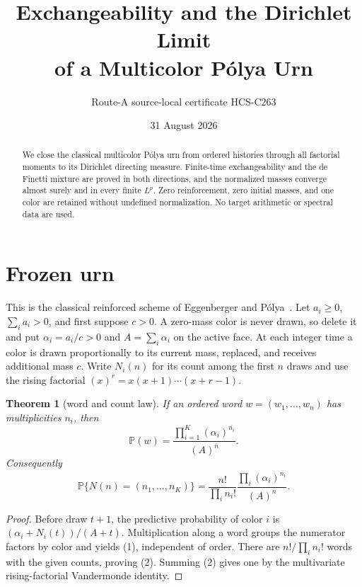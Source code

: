 \documentclass[10pt]{article}
\title{Exchangeability and the Dirichlet Limit\\of a Multicolor P\'olya Urn}
\author{Route-A source-local certificate HCS-C263}
\date{31 August 2026}
\newtheorem{theorem}{Theorem}
\newcommand{\Prb}{\mathbb P}
\begin{document}
\maketitle
\begin{abstract}
We close the classical multicolor P\'olya urn from ordered histories through
all factorial moments to its Dirichlet directing measure.  Finite-time
exchangeability and the de Finetti mixture are proved in both directions, and
the normalized masses converge almost surely and in every finite $L^p$.
Zero reinforcement, zero initial masses, and one color are retained without
undefined normalization.  No target arithmetic or spectral data are used.
\end{abstract}

\section{Frozen urn}
This is the classical reinforced scheme of Eggenberger and
P\'olya~\cite{EP}.
Let $a_i\ge0$, $\sum_i a_i>0$, and first suppose $c>0$.  A zero-mass color is
never drawn, so delete it and put $\alpha_i=a_i/c>0$ and
$A=\sum_i\alpha_i$ on the active face.  At each integer time a color is
drawn proportionally to its current mass, replaced, and receives additional
mass $c$.  Write $N_i(n)$ for its count among the first $n$ draws and use the
rising factorial $(x)^{\overline r}=x(x+1)\cdots(x+r-1)$.

\begin{theorem}[word and count law]
If an ordered word $w=(w_1,\ldots,w_n)$ has multiplicities $n_i$, then
\begin{equation}
 \Prb(w)=\frac{\prod_{i=1}^K(\alpha_i)^{\overline{n_i}}}
 {(A)^{\overline n}}.
\end{equation}
Consequently
\begin{equation}
 \Prb\{N(n)=(n_1,\ldots,n_K)\}
 =\frac{n!}{\prod_i n_i!}
 \frac{\prod_i(\alpha_i)^{\overline{n_i}}}{(A)^{\overline n}}.
\end{equation}
\end{theorem}
\begin{proof}
Before draw $t+1$, the predictive probability of color $i$ is
$(\alpha_i+N_i(t))/(A+t)$.  Multiplication along a word groups the numerator
factors by color and yields (1), independent of order.  There are
$n!/\prod_i n_i!$ words with the given counts, proving (2).  Summing (2)
gives one by the multivariate rising-factorial Vandermonde identity.
\end{proof}
\end{document}
